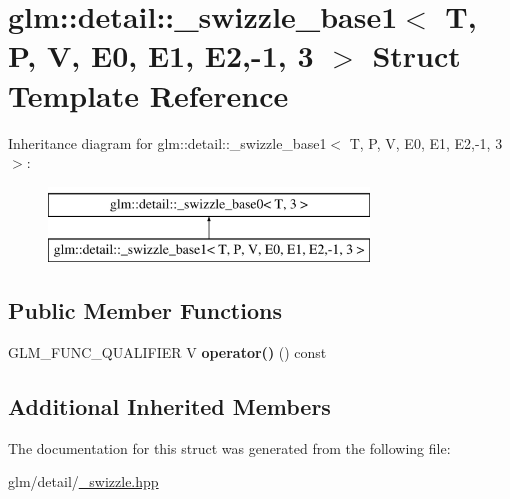 \hypertarget{structglm_1_1detail_1_1__swizzle__base1_3_01T_00_01P_00_01V_00_01E0_00_01E1_00_01E2_00-1_00_013_01_4}{\section{glm\-:\-:detail\-:\-:\-\_\-swizzle\-\_\-base1$<$ T, P, V, E0, E1, E2,-\/1, 3 $>$ Struct Template Reference}
\label{structglm_1_1detail_1_1__swizzle__base1_3_01T_00_01P_00_01V_00_01E0_00_01E1_00_01E2_00-1_00_013_01_4}
}
Inheritance diagram for glm\-:\-:detail\-:\-:\-\_\-swizzle\-\_\-base1$<$ T, P, V, E0, E1, E2,-\/1, 3 $>$\-:\begin{figure}[H]
\begin{center}
\leavevmode
\includegraphics[height=2.000000cm]{structglm_1_1detail_1_1__swizzle__base1_3_01T_00_01P_00_01V_00_01E0_00_01E1_00_01E2_00-1_00_013_01_4}
\end{center}
\end{figure}
\subsection*{Public Member Functions}
\begin{DoxyCompactItemize}
\item 
\hypertarget{structglm_1_1detail_1_1__swizzle__base1_3_01T_00_01P_00_01V_00_01E0_00_01E1_00_01E2_00-1_00_013_01_4_a94510ce33bf6a19e28b4f95f4e715807}{G\-L\-M\-\_\-\-F\-U\-N\-C\-\_\-\-Q\-U\-A\-L\-I\-F\-I\-E\-R V {\bfseries operator()} () const }\label{structglm_1_1detail_1_1__swizzle__base1_3_01T_00_01P_00_01V_00_01E0_00_01E1_00_01E2_00-1_00_013_01_4_a94510ce33bf6a19e28b4f95f4e715807}

\end{DoxyCompactItemize}
\subsection*{Additional Inherited Members}


The documentation for this struct was generated from the following file\-:\begin{DoxyCompactItemize}
\item 
glm/detail/\hyperlink{__swizzle_8hpp}{\-\_\-swizzle.\-hpp}\end{DoxyCompactItemize}

